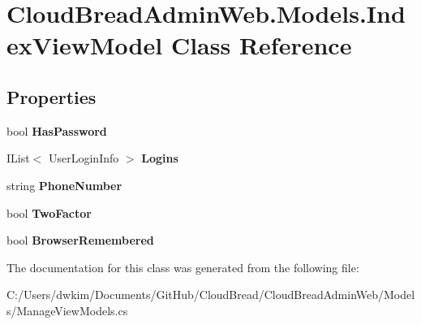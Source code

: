 \hypertarget{a00090}{}\section{Cloud\+Bread\+Admin\+Web.\+Models.\+Index\+View\+Model Class Reference}
\label{a00090}
\subsection*{Properties}
\begin{DoxyCompactItemize}
\item 
bool {\bfseries Has\+Password}\hypertarget{a00090_a341f3ba7ac181d4a1e839e4053b4a06b}{}\label{a00090_a341f3ba7ac181d4a1e839e4053b4a06b}

\item 
I\+List$<$ User\+Login\+Info $>$ {\bfseries Logins}\hypertarget{a00090_ae62fc9836800b53b5f9c4e2b858e6257}{}\label{a00090_ae62fc9836800b53b5f9c4e2b858e6257}

\item 
string {\bfseries Phone\+Number}\hypertarget{a00090_a8f42d419be92c45f1a7952220f34bbe9}{}\label{a00090_a8f42d419be92c45f1a7952220f34bbe9}

\item 
bool {\bfseries Two\+Factor}\hypertarget{a00090_a5f903d979816303fcafdeff2f530efc8}{}\label{a00090_a5f903d979816303fcafdeff2f530efc8}

\item 
bool {\bfseries Browser\+Remembered}\hypertarget{a00090_af678dc400ffcf0b9da0500f6bbecd917}{}\label{a00090_af678dc400ffcf0b9da0500f6bbecd917}

\end{DoxyCompactItemize}


The documentation for this class was generated from the following file\+:\begin{DoxyCompactItemize}
\item 
C\+:/\+Users/dwkim/\+Documents/\+Git\+Hub/\+Cloud\+Bread/\+Cloud\+Bread\+Admin\+Web/\+Models/Manage\+View\+Models.\+cs\end{DoxyCompactItemize}
